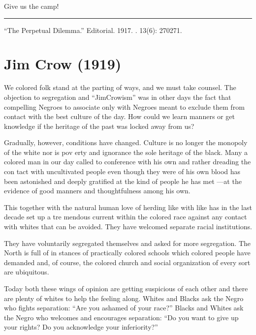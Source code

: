 \documentclass[letterpaper,10pt,english]{jupyterBook}
\begin{document}
\sphinxAtStartPar
Give us the camp!


\bigskip\hrule\bigskip


\sphinxAtStartPar
{} “The Perpetual Dilemma.” Editorial. 1917. . 13(6): 270\sphinxhyphen{}271.


\section{Jim Crow (1919)}
\label{\detokenize{Volumes/17/03/jim_crow:jim-crow-1919}}\label{\detokenize{Volumes/17/03/jim_crow::doc}}
\sphinxAtStartPar
We  colored folk stand at the parting of ways, and we must take counsel. The objection to segregation and “Jim\sphinxhyphen{}Crowism” was in other days the fact that compelling Ne­groes to associate only with Negroes meant to exclude them from contact with the best culture of the day. How could we learn manners or get knowledge if the heritage of the past was locked away from us?

\sphinxAtStartPar
Gradually, however, conditions have changed. Culture is no longer the monopoly of the white nor is pov­ erty and ignorance the sole heritage of the black. Many a colored man in our day called to conference with his own and rather dreading the con­ tact with uncultivated people even though they were of his own blood has been astonished and deeply grati­fied at the kind of people he has met —at the evidence of good manners and thoughtfulness among his own.

\sphinxAtStartPar
This together with the natural human love of herding like with like has in the last decade set up a tre­ mendous current within the colored race against any contact with whites that can be avoided. They have wel­comed separate racial institutions.

\sphinxAtStartPar
They have voluntarily segregated themselves and asked for more seg­regation. The North is full of in­ stances of practically colored schools which colored people have demanded and, of course, the colored church and social organization of every sort are ubiquitous.

\sphinxAtStartPar
Today both these wings of opinion are getting suspicious of each other and there are plenty of whites to help the feeling along. Whites and Blacks ask the Negro who fights separation: “Are you ashamed of your race?” Blacks and Whites ask the Negro who welcomes and encourages separation: “Do you want to give up your rights? Do you acknowledge your inferi­ority?”
\end{document}
